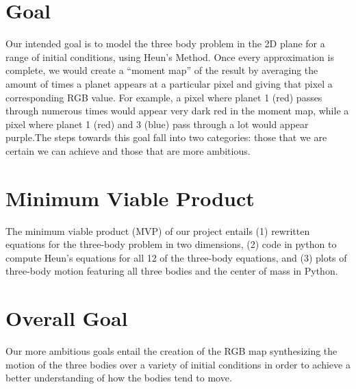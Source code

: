 \documentclass{article}
\begin{document}
\section{Goal}
Our intended goal is to model the three body problem in the 2D plane for a range of initial conditions, using Heun’s Method. Once every approximation is complete, we would create a “moment map” of the result by averaging the amount of times a planet appears at a particular pixel and giving that pixel a corresponding RGB value. For example, a pixel where planet 1 (red) passes through numerous times would appear very dark red in the moment map, while a pixel where planet 1 (red) and 3 (blue) pass through a lot would appear purple.The steps towards this goal fall into two categories: those that we are certain we can achieve and those that are more ambitious.

\section{Minimum Viable Product}
The minimum viable product (MVP) of our project entails (1) rewritten equations for the three-body problem in two dimensions, (2) code in python to compute Heun’s equations for all 12 of the three-body equations, and (3) plots of three-body motion featuring all three bodies and the center of mass in Python. 

\section{Overall Goal}
Our more ambitious goals entail the creation of the RGB map synthesizing the motion of the three bodies over a variety of initial conditions in order to achieve a better understanding of how the bodies tend to move. 
\end{document}
